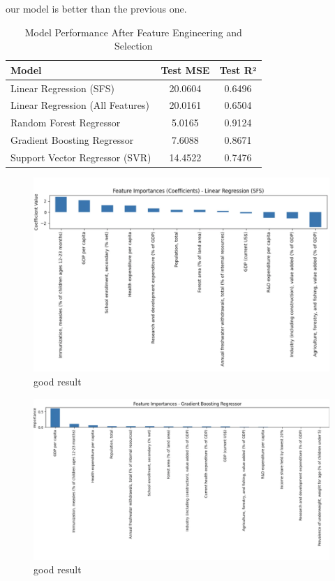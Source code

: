 \documentclass{article}
\begin{document}
our model is better than the previous one.

\begin{table}[h]
    \centering
    \caption{Model Performance After Feature Engineering and Selection}
    \label{tab:model_performance_improved}
    \begin{tabular}{|l|c|c|}
        \hline
        \textbf{Model} & \textbf{Test MSE} & \textbf{Test R²} \\
        \hline
        Linear Regression (SFS) & 20.0604 & 0.6496 \\
        Linear Regression (All Features) & 20.0161 & 0.6504 \\
        Random Forest Regressor & 5.0165 & 0.9124 \\
        Gradient Boosting Regressor & 7.6088 & 0.8671 \\
        Support Vector Regressor (SVR) & 14.4522 & 0.7476 \\
        \hline
    \end{tabular}
\end{table}

\begin{figure}[h]
    \centering
    \includegraphics[width=0.8\columnwidth]{./pic/T1.c.3.png} %
    \caption{good result}
    \label{fig:correlation_heatmap1}
\end{figure}
\begin{figure}[h]
    \centering
    \includegraphics[width=0.8\columnwidth]{./pic/T1.c.4.png} %
    \caption{good result}
    \label{fig:correlation_heatmap2}
\end{figure}
\end{document}
